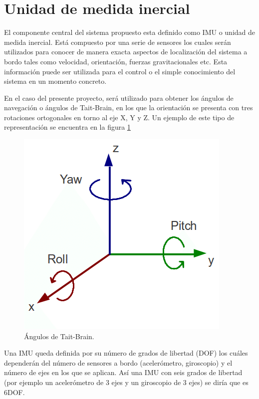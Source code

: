 \section{Unidad de medida inercial}\label{sec:IMU}
El componente central del sistema propuesto esta definido como IMU o unidad de medida inercial. Está compuesto por una serie de sensores los cuales serán utilizados para conocer de manera exacta aspectos de localización del sistema a bordo tales como velocidad, orientación, fuerzas gravitacionales etc. \newline
Esta información puede ser utilizada para el control o el simple conocimiento del sistema en un momento concreto. \newline

En el caso del presente proyecto, será utilizado para obtener los ángulos de navegación o ángulos de Tait-Brain, en los que la orientación se presenta con tres rotaciones ortogonales en torno al eje X, Y y Z. Un ejemplo de este tipo de representación se encuentra en la figura \ref{fig:orientacion}\newline


\begin{figure}[H]
	\center
	\includegraphics[scale=0.5]{imagenes/Balancing_robot/orientacion}
	\caption{Ángulos de Tait-Brain.}
	\label{fig:orientacion}
\end{figure}


Una IMU queda definida por su número de grados de libertad (DOF) los cuáles dependerán del número de sensores a bordo (acelerómetro, giroscopio) y el número de ejes en los que se aplican. Así una IMU con seis grados de libertad (por ejemplo un acelerómetro de 3 ejes y un giroscopio de 3 ejes) se diría que es 6DOF. \newline

